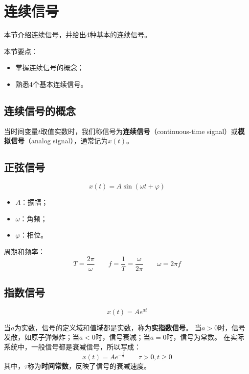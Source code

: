 \section{连续信号}

本节介绍连续信号，并给出4种基本的连续信号。

本节要点：
\begin{itemize}
    \item 掌握连续信号的概念；
    \item 熟悉4个基本连续信号。
\end{itemize}

\subsection{连续信号的概念}

\begin{definition}[连续信号]
当时间变量$t$取值实数时，我们称信号为{\bf 连续信号}（continuous-time signal）或{\bf 模拟信号}（analog signal），通常记为$x\left( t \right) $。
\end{definition}

\subsection{正弦信号}

\[
x\left( t \right) =A\sin \left( \omega t+\varphi \right)
\]
\begin{itemize}
    \item $A$：振幅；
    \item $\omega $：角频；
    \item $\varphi $：相位。
\end{itemize}
周期和频率：
\[
T=\frac{2\pi}{\omega} \qquad f=\frac{1}{T}=\frac{\omega}{2\pi} \qquad \omega =2\pi f
\]

\subsection{指数信号}

\[
x\left( t \right) =Ae^{at}
\]

当$a$为实数，信号的定义域和值域都是实数，称为{\bf 实指数信号}。
当$a>0$时，信号发散，如原子弹爆炸；当$a<0$时，信号衰减；当$a=0$时，信号为常数。
在实际系统中，一般信号都是衰减信号，所以写成：
\[
x\left( t \right) =Ae^{-\frac{t}{\tau}} \qquad \tau >0,t\geqslant 0
\]
其中，$\tau $称为{\bf 时间常数}，反映了信号的衰减速度。

